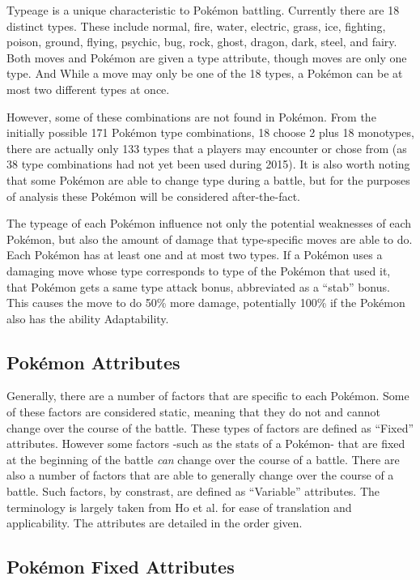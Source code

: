 \documentclass[12pt,twoside]{reedthesis}
\begin{document}
  Typeage is a unique characteristic to Pokémon battling. Currently there
  are 18 distinct types. These include normal, fire, water, electric,
  grass, ice, fighting, poison, ground, flying, psychic, bug, rock, ghost,
  dragon, dark, steel, and fairy. Both moves and Pokémon are given a type
  attribute, though moves are only one type. And While a move may only be
  one of the 18 types, a Pokémon can be at most two different types at
  once.
  
  However, some of these combinations are not found in Pokémon. From the
  initially possible 171 Pokémon type combinations, 18 choose 2 plus 18
  monotypes, there are actually only 133 types that a players may
  encounter or chose from (as 38 type combinations had not yet been used
  during 2015). It is also worth noting that some Pokémon are able to
  change type during a battle, but for the purposes of analysis these
  Pokémon will be considered after-the-fact.
  
  The typeage of each Pokémon influence not only the potential weaknesses
  of each Pokémon, but also the amount of damage that type-specific moves
  are able to do. Each Pokémon has at least one and at most two types. If
  a Pokémon uses a damaging move whose type corresponds to type of the
  Pokémon that used it, that Pokémon gets a same type attack bonus,
  abbreviated as a ``stab'' bonus. This causes the move to do 50\% more
  damage, potentially 100\% if the Pokémon also has the ability
  Adaptability.
  
  \subsection{Pokémon Attributes}\label{pokemon-attributes}
  
  Generally, there are a number of factors that are specific to each
  Pokémon. Some of these factors are considered static, meaning that they
  do not and cannot change over the course of the battle. These types of
  factors are defined as ``Fixed'' attributes. However some factors -such
  as the stats of a Pokémon- that are fixed at the beginning of the battle
  \emph{can} change over the course of a battle. There are also a number
  of factors that are able to generally change over the course of a
  battle. Such factors, by constrast, are defined as ``Variable''
  attributes. The terminology is largely taken from Ho et al. for ease of
  translation and applicability. The attributes are detailed in the order
  given.
  
  \subsection{Pokémon Fixed Attributes}\label{pokemon-fixed-attributes}
  
\end{document}
